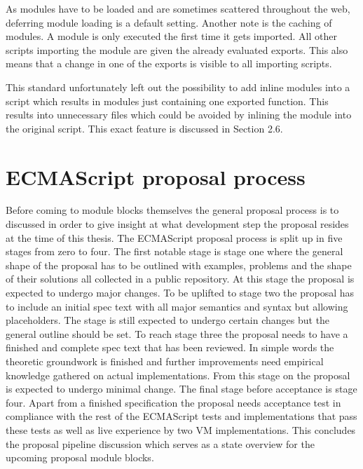 As modules have to be loaded and are sometimes scattered throughout the web, deferring module loading is a default setting. Another note is the caching of modules. A module is only executed the first time it gets imported. All other scripts importing the module are given the already evaluated exports. This also means that a change in one of the exports is visible to all importing scripts.

This standard unfortunately left out the possibility to add inline modules into a script which results in modules just containing one exported function. This results into unnecessary files which could be avoided by inlining the module into the original script. This exact feature is discussed in Section 2.6.

\section{ECMAScript proposal process}
Before coming to module blocks themselves the general proposal process is to discussed in order to give insight at what development step the proposal resides at the time of this thesis. The ECMAScript proposal process \cite{ecmaProp} is split up in five stages from zero to four. The first notable stage is stage one where the general shape of the proposal has to be outlined with examples, problems and the shape of their solutions all collected in a public repository. At this stage the proposal is expected to undergo major changes. To be uplifted to stage two the proposal has to include an initial spec text with all major semantics and syntax but allowing placeholders. The stage is still expected to undergo certain changes but the general outline should be set. To reach stage three the proposal needs to have a finished and complete spec text that has been reviewed. In simple words the theoretic groundwork is finished and further improvements need empirical knowledge gathered on actual implementations. From this stage on the proposal is expected to undergo minimal change. The final stage before acceptance is stage four. Apart from a finished specification the proposal needs acceptance test in compliance with the rest of the ECMAScript tests and implementations that pass these tests as well as live experience by two VM implementations. \cite{ecmaProp} This concludes the proposal pipeline discussion which serves as a state overview for the upcoming proposal module blocks.

